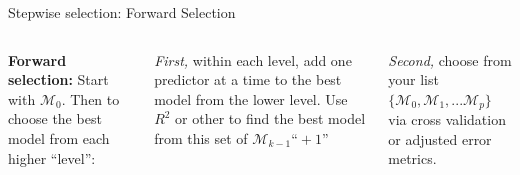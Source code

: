 \documentclass[mathserif, aspectratio=169]{beamer}
\begin{document}
\begin{frame}{Stepwise selection: Forward Selection}

\begin{columns}

\textbf{Forward selection:} Start with $\mathcal{M}_0$.  Then to choose the best model from each higher ``level'':

\vspace{5mm}
\textit{First, }within each level, add one predictor at a time to the best model from the lower level.  Use $R^2$ or other to find the best model from this set of $\mathcal{M}_{k-1} \text{``}+ 1\text{''}$

\vspace{5mm}

\textit{Second,} choose from your list $\{\mathcal{M}_0, \mathcal{M}_1,...\mathcal{M}_{p}\}$ via cross validation or adjusted error metrics.\\~\\



\end{columns}
\end{frame}
\end{document}
